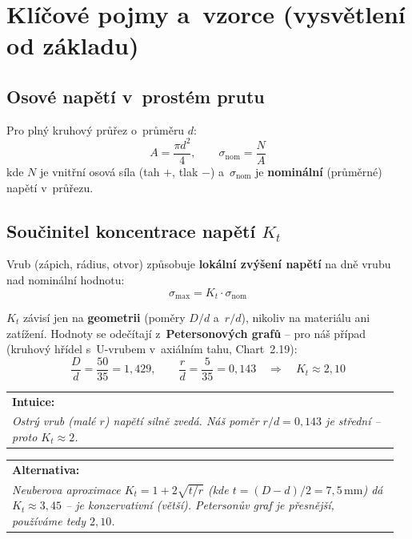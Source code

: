 \documentclass[a4paper,11pt]{article}
\makeatletter
\newcommand{\unit}[1]{\,\mathrm{#1}}
\newenvironment{poznamka}[1][Poznámka]{%
    \par\medskip\noindent\begin{tabular}{@{}|p{0.96\linewidth}@{}}\hline
    \textbf{#1:}\\[-0.4ex]\itshape\ignorespaces}{%
    \\\hline\end{tabular}\par\medskip}
\makeatother
\begin{document}
\section{Klíčové pojmy a~vzorce (vysvětlení od základu)}

\subsection{Osové napětí v~prostém prutu}

Pro plný kruhový průřez o~průměru $d$:
\begin{equation}
A = \frac{\pi d^2}{4},\qquad \sigma_{\mathrm{nom}} = \frac{N}{A}
\end{equation}
kde $N$ je vnitřní osová síla (tah $+$, tlak $-$) a~$\sigma_{\mathrm{nom}}$ je \textbf{nominální} (průměrné) napětí v~průřezu.

\subsection{Součinitel koncentrace napětí $K_t$}

Vrub (zápich, rádius, otvor) způsobuje \textbf{lokální zvýšení napětí} na dně vrubu nad nominální hodnotu:
\begin{equation}
\sigma_{\max} = K_t \cdot \sigma_{\mathrm{nom}}
\end{equation}

$K_t$ závisí jen na \textbf{geometrii} (poměry $D/d$ a~$r/d$), nikoliv na materiálu ani zatížení. Hodnoty se odečítají z~\textbf{Petersonových grafů} -- pro náš případ (kruhový hřídel s~U-vrubem v~axiálním tahu, Chart~2.19):
\begin{equation}
\frac{D}{d} = \frac{50}{35} = 1{,}429,\qquad \frac{r}{d} = \frac{5}{35} = 0{,}143 \quad\Rightarrow\quad \boxed{K_t \approx 2{,}10}
\end{equation}

\begin{poznamka}[Intuice]
Ostrý vrub (malé $r$) napětí silně zvedá. Náš poměr $r/d = 0{,}143$ je střední -- proto $K_t \approx 2$.
\end{poznamka}

\begin{poznamka}[Alternativa]
Neuberova aproximace $K_t = 1 + 2\sqrt{t/r}$ (kde $t = (D-d)/2 = 7{,}5\unit{mm}$) dá $K_t \approx 3{,}45$ -- je konzervativní (větší). Petersonův graf je přesnější, používáme tedy $2{,}10$.
\end{poznamka}
\end{document}
